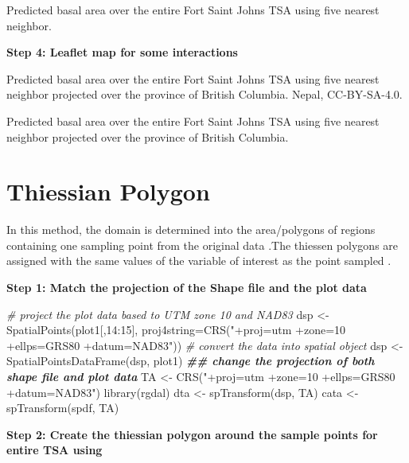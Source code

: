 \documentclass[
]{book}
\newenvironment{Shaded}{\begin{snugshade}}{\end{snugshade}}
\newcommand{\AttributeTok}[1]{\textcolor[rgb]{0.77,0.63,0.00}{#1}}
\newcommand{\CommentTok}[1]{\textcolor[rgb]{0.56,0.35,0.01}{\textit{#1}}}
\newcommand{\DecValTok}[1]{\textcolor[rgb]{0.00,0.00,0.81}{#1}}
\newcommand{\DocumentationTok}[1]{\textcolor[rgb]{0.56,0.35,0.01}{\textbf{\textit{#1}}}}
\newcommand{\FunctionTok}[1]{\textcolor[rgb]{0.00,0.00,0.00}{#1}}
\newcommand{\NormalTok}[1]{#1}
\newcommand{\OtherTok}[1]{\textcolor[rgb]{0.56,0.35,0.01}{#1}}
\newcommand{\SpecialCharTok}[1]{\textcolor[rgb]{0.00,0.00,0.00}{#1}}
\newcommand{\StringTok}[1]{\textcolor[rgb]{0.31,0.60,0.02}{#1}}
\begin{document}
Predicted basal area over the entire Fort Saint Johns TSA using five nearest neighbor.

\textbf{Step 4: Leaflet map for some interactions}

\label{fig:10-nearest-neighbor-4}Predicted basal area over the entire Fort Saint Johns TSA using five nearest neighbor projected over the province of British Columbia. Nepal, CC-BY-SA-4.0.

Predicted basal area over the entire Fort Saint Johns TSA using five nearest neighbor projected over the province of British Columbia.

\hypertarget{thiessian-polygon}{%
\section{Thiessian Polygon}\label{thiessian-polygon}}

In this method, the domain is determined into the area/polygons of regions containing one sampling point from the original data \citep{coulston_effect_nodate}.The thiessen polygons are assigned with the same values of the variable of interest as the point sampled \citep{yamada_thiessen_2016}.

\textbf{Step 1: Match the projection of the Shape file and the plot data}

\begin{Shaded}
\begin{Highlighting}[]
\CommentTok{\# project the plot data based to UTM zone 10 and NAD83}
\NormalTok{dsp }\OtherTok{\textless{}{-}} \FunctionTok{SpatialPoints}\NormalTok{(plot1[,}\DecValTok{14}\SpecialCharTok{:}\DecValTok{15}\NormalTok{], }\AttributeTok{proj4string=}\FunctionTok{CRS}\NormalTok{(}\StringTok{"+proj=utm +zone=10 +ellps=GRS80 +datum=NAD83"}\NormalTok{))}
\CommentTok{\# convert the data into spatial object}
\NormalTok{dsp }\OtherTok{\textless{}{-}} \FunctionTok{SpatialPointsDataFrame}\NormalTok{(dsp, plot1)}
\DocumentationTok{\#\# change the projection of both shape file and plot data}
\NormalTok{TA }\OtherTok{\textless{}{-}} \FunctionTok{CRS}\NormalTok{(}\StringTok{"+proj=utm +zone=10 +ellps=GRS80 +datum=NAD83"}\NormalTok{)}
\FunctionTok{library}\NormalTok{(rgdal)}
\NormalTok{dta }\OtherTok{\textless{}{-}} \FunctionTok{spTransform}\NormalTok{(dsp, TA)}
\NormalTok{cata }\OtherTok{\textless{}{-}} \FunctionTok{spTransform}\NormalTok{(spdf, TA)}
\end{Highlighting}
\end{Shaded}

\textbf{Step 2: Create the thiessian polygon around the sample points for entire TSA using}
\end{document}

